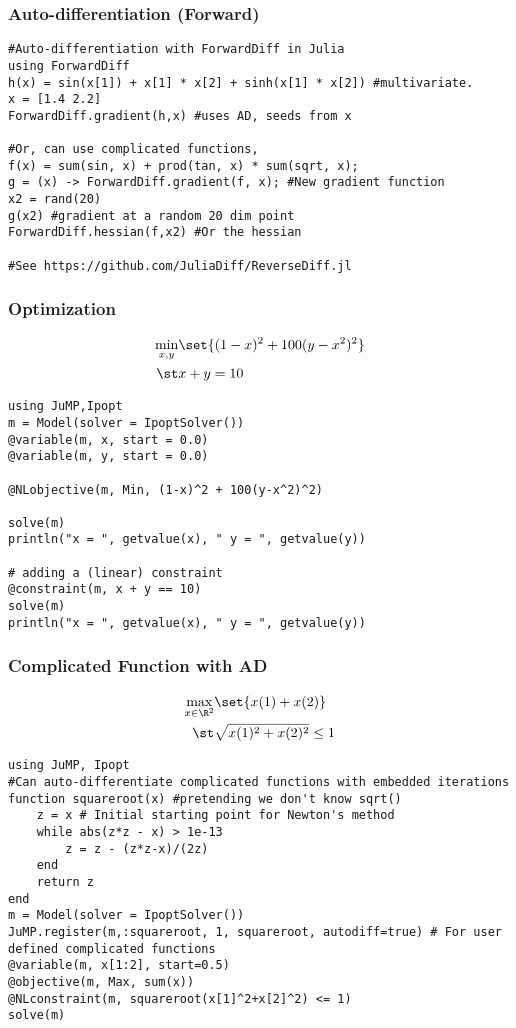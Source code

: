 \documentclass[nofootline]{etk-presentation}
\begin{document}
\begin{frame}[fragile]	\frametitle{Auto-differentiation (Forward)}
		\begin{verbatim}
#Auto-differentiation with ForwardDiff in Julia
using ForwardDiff
h(x) = sin(x[1]) + x[1] * x[2] + sinh(x[1] * x[2]) #multivariate.
x = [1.4 2.2]
ForwardDiff.gradient(h,x) #uses AD, seeds from x

#Or, can use complicated functions, 
f(x) = sum(sin, x) + prod(tan, x) * sum(sqrt, x);
g = (x) -> ForwardDiff.gradient(f, x); #New gradient function
x2 = rand(20)
g(x2) #gradient at a random 20 dim point
ForwardDiff.hessian(f,x2) #Or the hessian

#See https://github.com/JuliaDiff/ReverseDiff.jl
\end{verbatim}
\end{frame}	

\begin{frame}[fragile]	\frametitle{Optimization}
	\begin{align*}
	\min_{x,y}&\set{(1-x)^2 + 100(y-x^2)^2}\\
	\st & x + y = 10
	\end{align*}
		\begin{verbatim}	
using JuMP,Ipopt
m = Model(solver = IpoptSolver())
@variable(m, x, start = 0.0)
@variable(m, y, start = 0.0)

@NLobjective(m, Min, (1-x)^2 + 100(y-x^2)^2)

solve(m)
println("x = ", getvalue(x), " y = ", getvalue(y))

# adding a (linear) constraint
@constraint(m, x + y == 10)
solve(m)
println("x = ", getvalue(x), " y = ", getvalue(y))
	\end{verbatim}
\end{frame}	

\begin{frame}[fragile]	\frametitle{Complicated Function with AD}
	\begin{align*}
	\max_{x\in\R^2}&\set{x(1) + x(2)}\\
	\st & \sqrt{x(1)^2 + x(2)^2} \leq 1
	\end{align*}
	\begin{verbatim}	
using JuMP, Ipopt
#Can auto-differentiate complicated functions with embedded iterations
function squareroot(x) #pretending we don't know sqrt()
	z = x # Initial starting point for Newton's method
	while abs(z*z - x) > 1e-13
		z = z - (z*z-x)/(2z)
	end
	return z
end
m = Model(solver = IpoptSolver())
JuMP.register(m,:squareroot, 1, squareroot, autodiff=true) # For user defined complicated functions
@variable(m, x[1:2], start=0.5)
@objective(m, Max, sum(x))
@NLconstraint(m, squareroot(x[1]^2+x[2]^2) <= 1)
solve(m)
	\end{verbatim}
\end{frame}	
\end{document}
